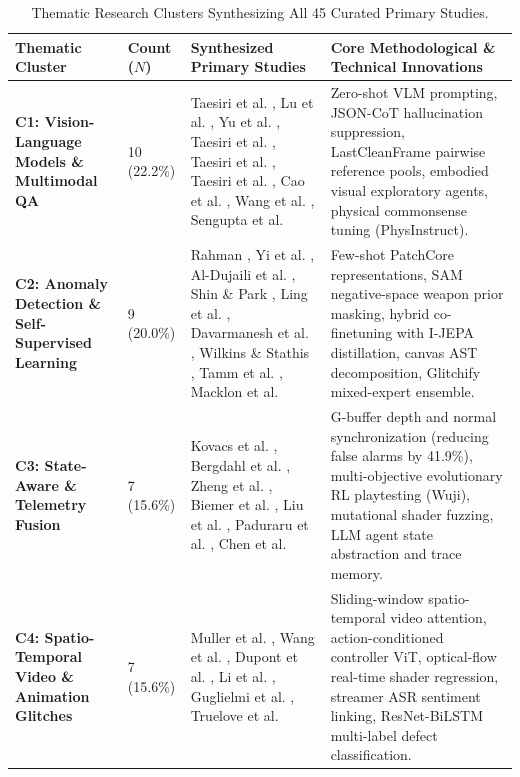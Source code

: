 \documentclass[preprint,12pt,3p]{elsarticle}
\begin{document}
\begin{table}[htbp]
\centering
\small
\caption{Thematic Research Clusters Synthesizing All 45 Curated Primary Studies.}
\label{tab:clusters}
\begin{tabularx}{\textwidth}{lp{1.8cm}p{4.2cm}X}
\toprule
\textbf{Thematic Cluster} & \textbf{Count ($N$)} & \textbf{Synthesized Primary Studies} & \textbf{Core Methodological \& Technical Innovations} \\
\midrule
\textbf{C1: Vision-Language Models \& Multimodal QA} & 10 (22.2\%) & Taesiri et al. \cite{taesiri2025videogameqa}, Lu et al. \cite{lu2026howfarvlms}, Yu et al. \cite{yu2026refglitch}, Taesiri et al. \cite{taesiri2024glitchbench}, Taesiri et al. \cite{taesiri2025videogamebunny}, Taesiri et al. \cite{taesiri2022llmszeroshot, taesiri2022clipmeetsgamephysics}, Cao et al. \cite{cao2024physgame}, Wang et al. \cite{wang2025autonomousvlm}, Sengupta et al. \cite{sengupta2026lecuration} & Zero-shot VLM prompting, JSON-CoT hallucination suppression, LastCleanFrame pairwise reference pools, embodied visual exploratory agents, physical commonsense tuning (PhysInstruct). \\
\textbf{C2: Anomaly Detection \& Self-Supervised Learning} & 9 (20.0\%) & Rahman \cite{rahman2023weaksupervision}, Yi et al. \cite{yi2025hybrid}, Al-Dujaili et al. \cite{aldujaili2022contrastive}, Shin \& Park \cite{shin2023deepvisual}, Ling et al. \cite{ling2020usingdeepcnn}, Davarmanesh et al. \cite{davarmanesh2020automated}, Wilkins \& Stathis \cite{wilkins2022learningperceptual}, Tamm et al. \cite{tamm2022automatedglitch}, Macklon et al. \cite{macklon2022html5bugs} & Few-shot PatchCore representations, SAM negative-space weapon prior masking, hybrid co-finetuning with I-JEPA distillation, canvas AST decomposition, Glitchify mixed-expert ensemble. \\
\textbf{C3: State-Aware \& Telemetry Fusion} & 7 (15.6\%) & Kovacs et al. \cite{kovacs2026stateaware}, Bergdahl et al. \cite{bergdahl2020automating}, Zheng et al. \cite{zheng2021wuji}, Biemer et al. \cite{biemer2021grammar}, Liu et al. \cite{liu2022inspector}, Paduraru et al. \cite{paduraru2022rivergame}, Chen et al. \cite{chen2023shaderbug} & G-buffer depth and normal synchronization (reducing false alarms by 41.9\%), multi-objective evolutionary RL playtesting (Wuji), mutational shader fuzzing, LLM agent state abstraction and trace memory. \\
\textbf{C4: Spatio-Temporal Video \& Animation Glitches} & 7 (15.6\%) & Muller et al. \cite{muller2026tempglitch}, Wang et al. \cite{wang2024actionconditioned}, Dupont et al. \cite{dupont2023glitchhunter}, Li et al. \cite{li2024realtimeshading}, Guglielmi et al. \cite{guglielmi2023haste, guglielmi2023gelid}, Truelove et al. \cite{truelove2023classifying} & Sliding-window spatio-temporal video attention, action-conditioned controller ViT, optical-flow real-time shader regression, streamer ASR sentiment linking, ResNet-BiLSTM multi-label defect classification. \\

\end{tabularx}
\end{table}
\end{document}
